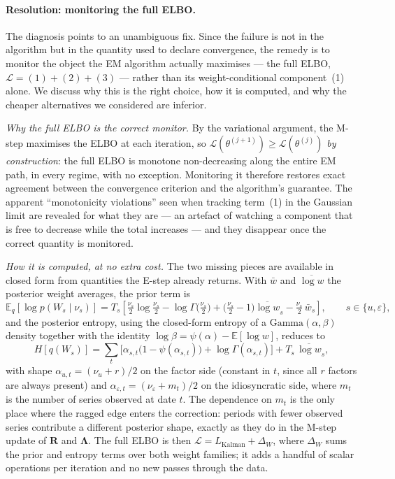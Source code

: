 \documentclass[11pt, a4paper, oneside]{article}
\newcommand{\mL}{\boldsymbol{\Lambda}}
\begin{document}
\paragraph{Resolution: monitoring the full ELBO.}
The diagnosis points to an unambiguous fix. Since the failure is not
in the algorithm but in the quantity used to declare convergence, the
remedy is to monitor the object the EM algorithm actually maximises
--- the full ELBO, $\mathcal{L} = (1)+(2)+(3)$ --- rather than its
weight-conditional component~(1) alone. We discuss why this is the
right choice, how it is computed, and why the cheaper alternatives we
considered are inferior.

\emph{Why the full ELBO is the correct monitor.} By the variational
argument, the M-step maximises the
ELBO at each iteration, so $\mathcal{L}(\theta^{(j+1)}) \ge
\mathcal{L}(\theta^{(j)})$ \emph{by construction}: the full ELBO is
monotone non-decreasing along the entire EM path, in every regime,
with no exception. Monitoring it therefore restores exact agreement
between the convergence criterion and the algorithm's guarantee. The
apparent ``monotonicity violations'' seen when tracking term~(1) in
the Gaussian limit are revealed for what they are --- an artefact of
watching a component that is free to decrease while the total
increases --- and they disappear once the correct quantity is
monitored.

\emph{How it is computed, at no extra cost.} The two missing pieces
are available in closed form from quantities the E-step already
returns. With $\bar{w}$ and $\overline{\log w}$ the posterior weight
averages, the prior term is
\[
\mathbb{E}_q[\log p(W_s\mid\nu_s)]
= T_s\!\left[\tfrac{\nu_s}{2}\log\tfrac{\nu_s}{2}
- \log\Gamma\!\big(\tfrac{\nu_s}{2}\big)
+ \big(\tfrac{\nu_s}{2}-1\big)\overline{\log w}_s
- \tfrac{\nu_s}{2}\,\bar{w}_s\right],
\qquad s\in\{u,\varepsilon\},
\]
and the posterior entropy, using the closed-form entropy of a
$\mathrm{Gamma}(\alpha,\beta)$ density together with the identity
$\log\beta = \psi(\alpha) - \mathbb{E}[\log w]$, reduces to
\[
H[q(W_s)]
= \sum_t \Big[\alpha_{s,t}\big(1-\psi(\alpha_{s,t})\big)
+ \log\Gamma(\alpha_{s,t})\Big] + T_s\,\overline{\log w}_s,
\]
with shape $\alpha_{u,t} = (\nu_u+r)/2$ on the factor side (constant
in $t$, since all $r$ factors are always present) and
$\alpha_{\varepsilon,t} = (\nu_\varepsilon + m_t)/2$ on the
idiosyncratic side, where $m_t$ is the number of series observed at
date $t$. The dependence on $m_t$ is the only place where the ragged
edge enters the correction: periods with fewer observed series
contribute a different posterior shape, exactly as they do in the
M-step update of $\mathbf{R}$ and $\mL$. The full ELBO is then
$\mathcal{L} = L_{\mathrm{Kalman}} + \Delta_W$, where $\Delta_W$ sums
the prior and entropy terms over both weight families; it adds a
handful of scalar operations per iteration and no new passes through
the data.
\end{document}
